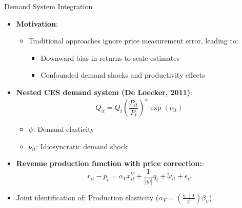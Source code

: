 \documentclass[aspectratio=169]{beamer}  %
\begin{document}
\begin{frame}{Demand System Integration}
\begin{itemize}
\item \textbf{Motivation}: 
    \begin{itemize}
        \item Traditional approaches \alert{ignore price measurement error}, leading to:
        \begin{itemize}
            \item Downward bias in returns-to-scale estimates
            \item Confounded demand shocks and productivity effects
        \end{itemize}
    \end{itemize}
    \item \textbf{Nested CES demand system (De Loecker, 2011)}:
    \[
    Q_{it} = Q_t\left(\frac{P_{it}}{P_t}\right)^\psi \exp(\nu_{it})
    \]
    \begin{itemize}
        \item $\psi$: Demand elasticity
        \item $\nu_{it}$: Idiosyncratic demand shock
    \end{itemize}
    
    \item \textbf{Revenue production function with price correction:}:
    \[
    r_{it} - p_t = \alpha_{V}x^{V}_{it} + \frac{1}{|\psi|}q_t + \tilde{\omega}_{it} + \tilde{\epsilon}_{it}
    \]
   \item Joint identification of: Production elasticity ($\alpha_V=(\frac{\psi+1}{\psi})\beta_{V}$)
\end{itemize}
\end{frame}
\end{document}
